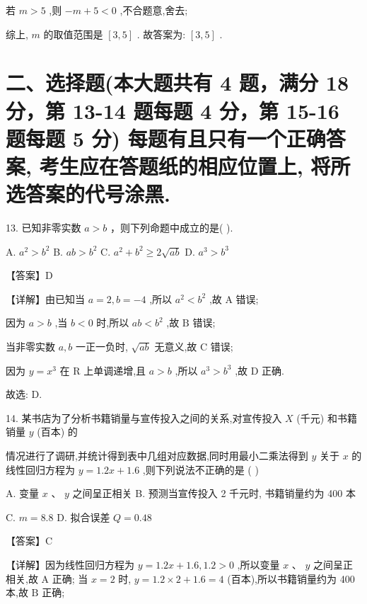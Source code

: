\documentclass[10pt]{article}
\begin{document}
若 \(m > 5\) ,则 \(- m + 5 < 0\) ,不合题意,舍去;

综上, \(m\) 的取值范围是 \(\left\lbrack  {3,5}\right\rbrack\) . 故答案为: \(\left\lbrack  {3,5}\right\rbrack\) .

\section*{二、选择题(本大题共有 4 题，满分 18 分，第 13-14 题每题 4 分，第 15-16 题每题 5 分) 每题有且只有一个正确答案, 考生应在答题纸的相应位置上, 将所选答案的代号涂黑.}

13. 已知非零实数 \(a > b\) ，则下列命题中成立的是( ).

A. \({a}^{2} > {b}^{2}\) B. \({ab} > {b}^{2}\) C. \({a}^{2} + {b}^{2} \geq  2\sqrt{ab}\) D. \({a}^{3} > {b}^{3}\)

【答案】D

【详解】由已知当 \(a = 2,b =  - 4\) ,所以 \({a}^{2} < {b}^{2}\) ,故 A 错误;

因为 \(a > b\) ,当 \(b < 0\) 时,所以 \({ab} < {b}^{2}\) ,故 \(\mathrm{B}\) 错误;

当非零实数 \(a,b\) 一正一负时, \(\sqrt{ab}\) 无意义,故 \(\mathrm{C}\) 错误;

因为 \(y = {x}^{3}\) 在 \(\mathrm{R}\) 上单调递增,且 \(a > b\) ,所以 \({a}^{3} > {b}^{3}\) ,故 \(\mathrm{D}\) 正确.

故选: D.

14. 某书店为了分析书籍销量与宣传投入之间的关系,对宣传投入 \(X\) (千元) 和书籍销量 \(y\) (百本) 的

情况进行了调研,并统计得到表中几组对应数据,同时用最小二乘法得到 \(y\) 关于 \(x\) 的线性回归方程为 \(y = {1.2x} + {1.6}\) ,则下列说法不正确的是 ( )

\begin{center}
\end{center}

A. 变量 \(x\) 、 \(y\) 之间呈正相关 B. 预测当宣传投入 2 千元时, 书籍销量约为 400 本

C. \(m = {8.8}\) D. 拟合误差 \(Q = {0.48}\)

【答案】C

【详解】因为线性回归方程为 \(y = {1.2x} + {1.6},{1.2} > 0\) ,所以变量 \(x\text{ 、 }y\) 之间呈正相关,故 \(\mathrm{A}\) 正确; 当 \(x = 2\) 时, \(y = {1.2} \times  2 + {1.6} = 4\) (百本),所以书籍销量约为 400 本,故 \(\mathrm{B}\) 正确;
\end{document}
